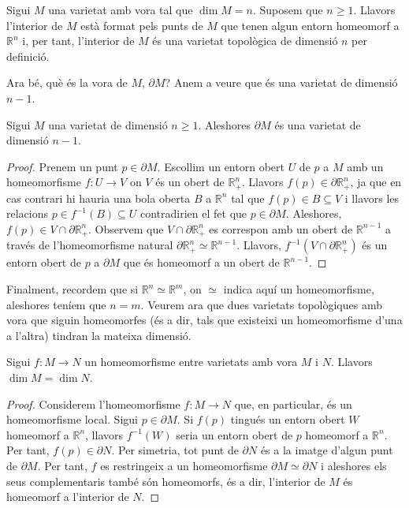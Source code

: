 \documentclass[../main.tex]{subfiles}
\begin{document}
Sigui $M$ una varietat amb vora tal que $\dim M = n$. Suposem que $n\geq 1$. Llavors l'interior de $M$ està format pels punts de $M$ que tenen algun entorn homeomorf a $\mathbb{R}^n$ i, per tant, l'interior de $M$ és una varietat topològica de dimensió $n$ per definició.

Ara bé, què és la vora de $M$, $\partial M$? Anem a veure que és una varietat de dimensió $n-1$.

\begin{prop}
\label{prop:voraesvarietat} Sigui $M$ una varietat de dimensió $n\geq 1$. Aleshores $\partial M$ és una varietat de dimensió $n-1$.
\end{prop}
\begin{proof}
Prenem un punt $p\in\partial M$. Escollim un entorn obert $U$ de $p$ a $M$ amb un homeomorfisme $f:U\rightarrow V$ on $V$ és un obert de $\mathbb{R}^n_+$. Llavors $f(p)\in \partial \mathbb{R}^n_+$, ja que en cas contrari hi hauria una bola oberta $B$ a $\mathbb{R}^n$ tal que $f(p)\in B\subseteq V$ i llavors les relacions $p\in f^{-1}(B)\subseteq U$ contradirien el fet que $p\in\partial M$. Aleshores, $f(p)\in V\cap \partial\mathbb{R}_+^n$. Observem que $V\cap \partial\mathbb{R}^n_+$ es correspon amb un obert de $\mathbb{R}^{n-1}$ a través de l'homeomorfisme natural $\partial \mathbb{R}^n_+\simeq \mathbb{R}^{n-1}$. Llavors, $f^{-1}(V\cap\partial \mathbb{R}^n_+)$ és un entorn obert de $p$ a $\partial M$ que és homeomorf a un obert de $\mathbb{R}^{n-1}$.
\end{proof}

Finalment, recordem que si $\mathbb{R}^n\simeq \mathbb{R}^m$, on $\simeq$ indica aquí un homeomorfisme, aleshores teníem que $n=m$. Veurem ara que dues varietats topològiques amb vora que siguin homeomorfes (és a dir, tals que existeixi un homeomorfisme d'una a l'altra) tindran la mateixa dimensió.

\begin{prop}
\label{prop:varietatsambvorahomeomorfes} Sigui $f:M\rightarrow N$ un homeomorfisme entre varietats amb vora $M$ i $N$. Llavors $\dim M=\dim N$.
\end{prop}
\begin{proof}
Considerem l'homeomorfisme $f:M\rightarrow N$ que, en particular, és un homeomorfisme local. Sigui $p\in \partial M$. Si $f(p)$ tingués un entorn obert $W$ homeomorf a $\mathbb{R}^n$, llavors $f^{-1}(W)$ seria un entorn obert de $p$ homeomorf a $\mathbb{R}^n$. Per tant, $f(p)\in\partial N$. Per simetria, tot punt de $\partial N$ és a la imatge d'algun punt de $\partial M$. Per tant, $f$ es restringeix a un homeomorfisme $\partial M\simeq \partial N$ i aleshores els seus complementaris també són homeomorfs, és a dir, l'interior de $M$ és homeomorf a l'interior de $N$.
\end{proof}
\end{document}
